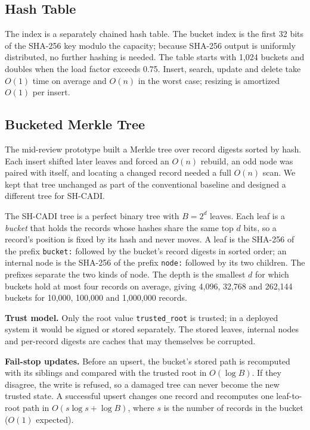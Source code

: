 \documentclass[conference]{IEEEtran}
\newcommand{\code}[1]{\texttt{#1}}
\begin{document}
\subsection{Hash Table}

The index is a separately chained hash table. The bucket index is the first 32 bits of the SHA-256 key modulo the capacity; because SHA-256 output is uniformly distributed, no further hashing is needed. The table starts with 1,024 buckets and doubles when the load factor exceeds 0.75. Insert, search, update and delete take $O(1)$ time on average and $O(n)$ in the worst case; resizing is amortized $O(1)$ per insert.

\subsection{Bucketed Merkle Tree}

The mid-review prototype built a Merkle tree over record digests sorted by hash. Each insert shifted later leaves and forced an $O(n)$ rebuild, an odd node was paired with itself, and locating a changed record needed a full $O(n)$ scan. We kept that tree unchanged as part of the conventional baseline and designed a different tree for SH-CADI.

The SH-CADI tree is a perfect binary tree with $B = 2^d$ leaves. Each leaf is a \emph{bucket} that holds the records whose hashes share the same top $d$ bits, so a record's position is fixed by its hash and never moves. A leaf is the SHA-256 of the prefix \code{bucket:} followed by the bucket's record digests in sorted order; an internal node is the SHA-256 of the prefix \code{node:} followed by its two children. The prefixes separate the two kinds of node. The depth is the smallest $d$ for which buckets hold at most four records on average, giving 4,096, 32,768 and 262,144 buckets for 10,000, 100,000 and 1,000,000 records.

\textbf{Trust model.} Only the root value \code{trusted\_root} is trusted; in a deployed system it would be signed or stored separately. The stored leaves, internal nodes and per-record digests are caches that may themselves be corrupted.

\textbf{Fail-stop updates.} Before an upsert, the bucket's stored path is recomputed with its siblings and compared with the trusted root in $O(\log B)$. If they disagree, the write is refused, so a damaged tree can never become the new trusted state. A successful upsert changes one record and recomputes one leaf-to-root path in $O(s \log s + \log B)$, where $s$ is the number of records in the bucket ($O(1)$ expected).
\end{document}
